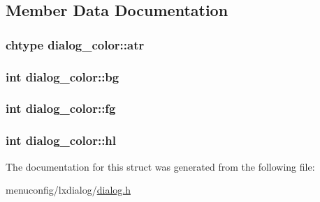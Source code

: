 \subsection{Member Data Documentation}
\hypertarget{structdialog__color_abfb3a5854ac137638cfea638fce34ab5}{
\subsubsection[{atr}]{\setlength{\rightskip}{0pt plus 5cm}chtype dialog\-\_\-color\-::atr}}\label{structdialog__color_abfb3a5854ac137638cfea638fce34ab5}
\hypertarget{structdialog__color_aa8f3267c3ae46156f548b7ab1543ace1}{
\subsubsection[{bg}]{\setlength{\rightskip}{0pt plus 5cm}int dialog\-\_\-color\-::bg}}\label{structdialog__color_aa8f3267c3ae46156f548b7ab1543ace1}
\hypertarget{structdialog__color_aba816605e659bab4a7c1cf4fe5538eaf}{
\subsubsection[{fg}]{\setlength{\rightskip}{0pt plus 5cm}int dialog\-\_\-color\-::fg}}\label{structdialog__color_aba816605e659bab4a7c1cf4fe5538eaf}
\hypertarget{structdialog__color_a293709c3e84d6274396dfaf2ff9416a0}{
\subsubsection[{hl}]{\setlength{\rightskip}{0pt plus 5cm}int dialog\-\_\-color\-::hl}}\label{structdialog__color_a293709c3e84d6274396dfaf2ff9416a0}


The documentation for this struct was generated from the following file\-:\begin{DoxyCompactItemize}
\item 
menuconfig/lxdialog/\hyperlink{dialog_8h}{dialog.\-h}\end{DoxyCompactItemize}
